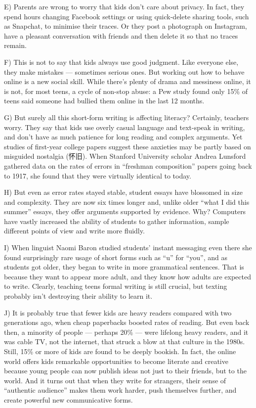 \documentclass[UTF8,11pt]{ctexart}
\begin{document}
E) Parents are wrong to worry that kids don’t care about privacy. In fact, they spend hours changing Facebook settings or using quick-delete sharing tools, such as Snapchat, to minimise their traces. Or they post a photograph on Instagram, have a pleasant conversation with friends and then delete it so that no traces remain.


F) This is not to say that kids always use good judgment. Like everyone else, they make mistakes — sometimes serious ones. But working out how to behave online is a new social skill. While there’s plenty of drama and messiness online, it is not, for most teens, a cycle of non-stop abuse: a Pew study found only 15\% of teens said someone had bullied them online in the last 12 months.


G) But surely all this short-form writing is affecting literacy? Certainly, teachers worry. They say that kids use overly casual language and text-speak in writing, and don’t have as much patience for long reading and complex arguments. Yet studies of first-year college papers suggest these anxieties may be partly based on misguided nostalgia (怀旧). When Stanford University scholar Andrea Lunsford gathered data on the rates of errors in “freshman composition” papers going back to 1917, she found that they were virtually identical to today.


H) But even as error rates stayed stable, student essays have blossomed in size and complexity. They are now six times longer and, unlike older “what I did this summer” essays, they offer arguments supported by evidence. Why? Computers have vastly increased the ability of students to gather information, sample different points of view and write more fluidly.


I) When linguist Naomi Baron studied students’ instant messaging even there she found surprisingly rare usage of short forms such as “u” for “you”, and as students got older, they began to write in more grammatical sentences. That is because they want to appear more adult, and they know how adults are expected to write. Clearly, teaching teens formal writing is still crucial, but texting probably isn’t destroying their ability to learn it.


J) It is probably true that fewer kids are heavy readers compared with two generations ago, when cheap paperbacks boosted rates of reading. But even back then, a minority of people — perhaps 20\% — were lifelong heavy readers, and it was cable TV, not the internet, that struck a blow at that culture in the 1980s. Still, 15\% or more of kids are found to be deeply bookish. In fact, the online world offers kids remarkable opportunities to become literate and creative because young people can now publish ideas not just to their friends, but to the world. And it turns out that when they write for strangers, their sense of “authentic audience” makes them work harder, push themselves further, and create powerful new communicative forms.
\end{document}
